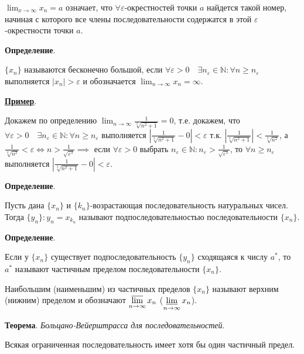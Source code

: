 \documentclass{article}
\newcommand{\parspace}{\vspace{10pt}}
\newcommand{\dslim}{\displaystyle\lim}
\newcommand{\dslimn}{\dslim_{n \to \infty}}
\theoremstyle{break}
\begin{document}
$\displaystyle\lim_{x \rightarrow \infty} x_n = a$ означает, что
$\forall \varepsilon$-окрестностей точки $a$ найдется такой номер, 
начиная с которого все члены последовательности содержатся в этой
$\varepsilon$-окрестности точки $a$.

\parspace

\textbf{Определение}.

$\{x_n\}$ называются бесконечно большой, если
$\forall \varepsilon > 0 \quad \exists n_\varepsilon \in \mathbb{N}:
\forall n \ge n_\varepsilon$ выполняется $|x_n| > \varepsilon$ и
обозначается $\dslimn x_n = \infty$.

\parspace

\underline{\textbf{Пример}}.

Докажем по определению 
$\dslimn \frac{1}{\sqrt[3]{n^2 + 1}} = 0$,
т.е. докажем, что $\forall \varepsilon > 0 \quad \exists n_\varepsilon \in \mathbb{N}:
\forall n \ge n_\varepsilon$ выполняется $\left|\frac{1}{\sqrt[3]{n^2 + 1}} - 0\right| < \varepsilon$
т.к. $\left|\frac{1}{\sqrt[3]{n^2 + 1}}\right| < \frac{1}{\sqrt[3]{n^2}}$,
а $\frac{1}{\sqrt[3]{n^2}} < \varepsilon \Leftrightarrow n > \frac{1}{\sqrt{\varepsilon^3}}
\implies$ если $\forall \varepsilon > 0$ выбрать 
$n_\varepsilon \in \mathbb{N}: n_\varepsilon > \frac{1}{\sqrt{\varepsilon^3}}$,
то $\forall n \ge n_\varepsilon$ выполняется $\left|\frac{1}{\sqrt[3]{n^2 + 1}} - 0\right| < \varepsilon$.

\parspace

\textbf{Определение}.

Пусть дана $\{x_n\}$ и $\{k_n\}$-возрастающая последовательность натуральных чисел.
Тогда $\{y_n\}: y_n = x_{k_n}$ называют подпоследовательностью последовательности $\{x_n\}$.

\parspace

\textbf{Определение}.

Если у $\{x_n\}$ существует подпоследовательность $\{y_n\}$ сходящаяся к числу $a^*$,
то $a^*$ называют частичным пределом последовательности $\{x_n\}$.

Наибольшим (наименьшим) из частичных пределов $\{x_n\}$ называют верхним (нижним) пределом
и обозначают $\displaystyle\varlimsup_{n \to \infty} x_n$
($\displaystyle\varliminf_{n \to \infty} x_n$).

\parspace

\textbf{Теорема}. \textit{Больцано-Вейерштрасса для последовательностей}.

Всякая ограниченная последовательность имеет хотя бы один частичный предел.
\end{document}
